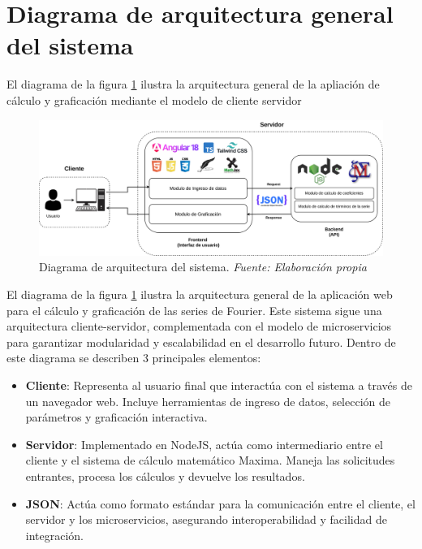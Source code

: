 \section{Diagrama de arquitectura general del sistema}
El diagrama de  la figura \ref{fig:diagrama_arqui} ilustra la arquitectura general de la apliación de cálculo y graficación mediante el modelo de cliente servidor
\begin{figure}[H]
	\centering
	\includegraphics[width=1\textwidth]{img/chapter04/Arquitectura-Sistema-TT.drawio.pdf}
	\caption[Diagrama de arquitectura del sistema.]{Diagrama de arquitectura del sistema. \textit{Fuente: \textit{Elaboración propia}}}
	\label{fig:diagrama_arqui}  %
\end{figure}
El diagrama de la figura \ref{fig:diagrama_arqui} ilustra la arquitectura general de la aplicación web para el cálculo y graficación de las series de Fourier. Este sistema sigue una arquitectura cliente-servidor, complementada con el modelo de microservicios para garantizar modularidad y escalabilidad en el desarrollo futuro. Dentro de este diagrama se describen 3 principales elementos:

\begin{itemize}
	\item \textbf{Cliente}: Representa al usuario final que interactúa con el sistema a través de un navegador web. Incluye herramientas de ingreso de datos, selección de parámetros y graficación interactiva.
	\item \textbf{Servidor}: Implementado en NodeJS, actúa como intermediario entre el cliente y el sistema de cálculo matemático Maxima. Maneja las solicitudes entrantes, procesa los cálculos y devuelve los resultados.
	\item \textbf{JSON}: Actúa como formato estándar para la comunicación entre el cliente, el servidor y los microservicios, asegurando interoperabilidad y facilidad de integración.
\end{itemize}

